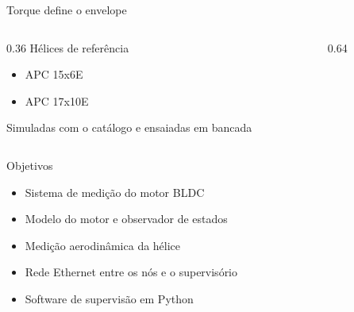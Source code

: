 \begin{frame}{Torque define o envelope}
  \begin{columns}[c]
    \begin{column}{0.36\textwidth}
      Hélices de referência
      \begin{itemize}
        \item APC 15x6E
        \item APC 17x10E
      \end{itemize}
      \vspace{0.5em}
      Simuladas com o catálogo e ensaiadas em bancada
    \end{column}
    \begin{column}{0.64\textwidth}
      \centering
    \end{column}
  \end{columns}
\end{frame}

\begin{frame}{Objetivos}

  \vspace{0.6em}
  \begin{itemize}
    \item Sistema de medição do motor BLDC
    \item Modelo do motor e observador de estados
    \item Medição aerodinâmica da hélice
    \item Rede Ethernet entre os nós e o supervisório
    \item Software de supervisão em Python
  \end{itemize}
\end{frame}
